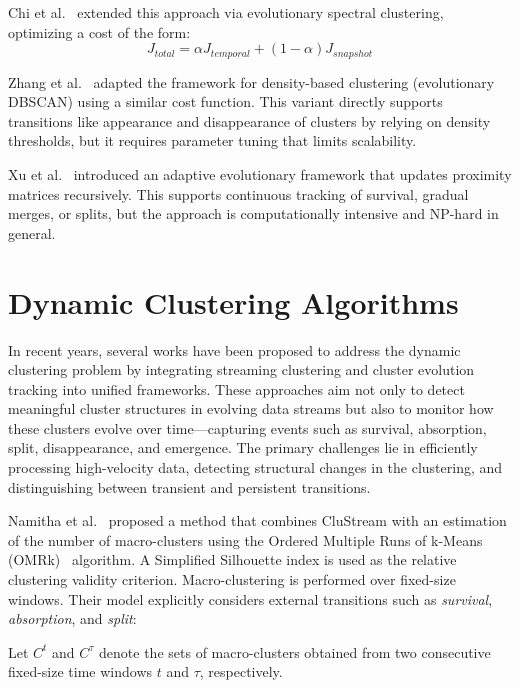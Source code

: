 Chi et al.~\cite{spectral_evolutionary_clustering} extended this approach via
evolutionary spectral clustering, optimizing a cost of the form:
\begin{equation}
    J_{total} = \alpha J_{temporal} + (1-\alpha)J_{snapshot}
\end{equation}

Zhang et al.~\cite{density_evolutionary_clustering} adapted the framework for
density-based clustering (evolutionary DBSCAN) using a similar cost function.
This variant directly supports transitions like appearance and disappearance of
clusters by relying on density thresholds, but it requires parameter tuning
that limits scalability.

Xu et al.~\cite{adaptive_evolutionary_clustering} introduced an adaptive
evolutionary framework that updates proximity matrices recursively. This
supports continuous tracking of survival, gradual merges, or splits, but the
approach is computationally intensive and NP-hard in general.

\section{Dynamic Clustering Algorithms}\label{sec:dynamic_clustering_algorithms}

In recent years, several works have been proposed to address the dynamic
clustering problem by integrating streaming clustering and cluster evolution
tracking into unified frameworks. These approaches aim not only to detect
meaningful cluster structures in evolving data streams but also to monitor how
these clusters evolve over time—capturing events such as survival, absorption,
split, disappearance, and emergence. The primary challenges lie in efficiently
processing high-velocity data, detecting structural changes in the clustering,
and distinguishing between transient and persistent transitions.

Namitha et al.~\cite{namitha_dynamic_clustering_1} proposed a method that
combines CluStream with an estimation of the number of macro-clusters using the
Ordered Multiple Runs of k-Means (OMRk)~\cite{omrk} algorithm. A Simplified
Silhouette index is used as the relative clustering validity criterion.
Macro-clustering is performed over fixed-size windows. Their model explicitly
considers external transitions such as \textit{survival}, \textit{absorption},
and \textit{split}:

Let $ C^t $ and $ C^\tau $ denote the sets of macro-clusters obtained from two
consecutive fixed-size time windows $ t $ and $ \tau $, respectively.

